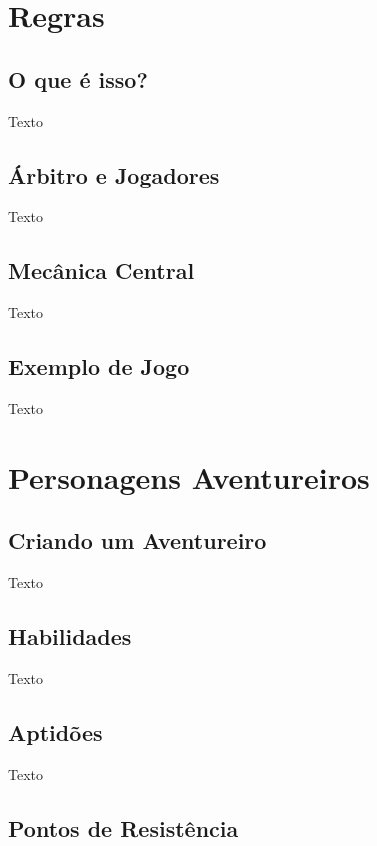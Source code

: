 \documentclass[a4paper, twocolumn, 10pt]{book}
\begin{document}
\tableofcontents

\chapter{Regras}

\section{O que é isso?}

Texto

\section{Árbitro e Jogadores}

Texto

\section{Mecânica Central}

Texto

\section{Exemplo de Jogo}

Texto

\chapter{Personagens Aventureiros}

\section{Criando um Aventureiro}

Texto

\section{Habilidades}

Texto

\section{Aptidões}

Texto

\section{Pontos de Resistência}
\end{document}
